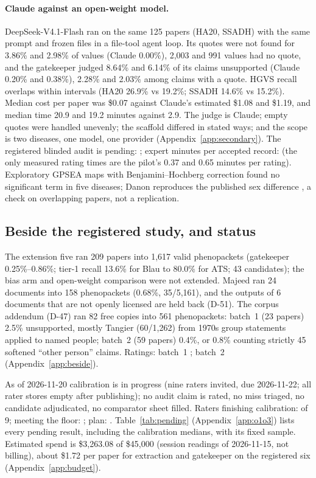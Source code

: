 \documentclass{article} %
\begin{document}
\paragraph{Claude against an open-weight model.} DeepSeek-V4.1-Flash \citep{Deepseekai2026Deepseekv4Towards} ran on the same 125 papers (HA20, SSADH) with the same prompt and frozen files in a file-tool agent loop. Its quotes were not found for 3.86\% and 2.98\% of values (Claude 0.00\%), 2,003 and 991 values had no quote, and the gatekeeper judged 8.64\% and 6.14\% of its claims unsupported (Claude 0.20\% and 0.38\%), 2.28\% and 2.03\% among claims with a quote. HGVS recall overlaps within intervals (HA20 26.9\% vs 19.2\%; SSADH 14.6\% vs 15.2\%). Median cost per paper was \$0.07 against Claude's estimated \$1.08 and \$1.19, and median time 20.9 and 19.2 minutes against 2.9. The judge is Claude; empty quotes were handled unevenly; the scaffold differed in stated ways; and the scope is two diseases, one model, one provider (Appendix~\ref{app:secondary}). The registered blinded audit is pending: ; expert minutes per accepted record:  (the only measured rating times are the pilot's 0.37 and 0.65 minutes per rating). Exploratory GPSEA maps \citep{rekerle2026_gpsea} with Benjamini--Hochberg correction \citep{Benjamini1995ControllingFalse} found no significant term in five diseases; Danon reproduces the published sex difference \citep{boucek2011_danon_natural_history}, a check on overlapping papers, not a replication.

\subsection{Beside the registered study, and status}
\label{sec:beside}
The extension five ran 209 papers into 1,617 valid phenopackets (gatekeeper 0.25\%--0.86\%; tier-1 recall 13.6\% for Blau to 80.0\% for ATS; 43 candidates); the bias arm and open-weight comparison were not extended. Majeed ran 24 documents into 158 phenopackets (0.68\%, 35/5,161), and the outputs of 6 documents that are not openly licensed are held back (D-51). The corpus addendum (D-47) ran 82 free copies into 561 phenopackets: batch~1 (23 papers) 2.5\% unsupported, mostly Tangier (60/1,262) from 1970s group statements applied to named people; batch~2 (59 papers) 0.4\%, or 0.8\% counting strictly 45 softened ``other person'' claims. Ratings: batch~1 ; batch~2  (Appendix~\ref{app:beside}).

As of 2026-11-20 calibration is in progress (nine raters invited, due 2026-11-22; all rater stores empty after publishing); no audit claim is rated, no miss triaged, no candidate adjudicated, no comparator sheet filled. Raters finishing calibration:  of 9; meeting the floor: ; plan: . Table~\ref{tab:pending} (Appendix~\ref{app:o1o3}) lists every pending result, including the calibration medians, with its fixed sample. Estimated spend is \$3,263.08 of \$45,000 (session readings of 2026-11-15, not billing), about \$1.72 per paper for extraction and gatekeeper on the registered six (Appendix~\ref{app:budget}).
\end{document}
